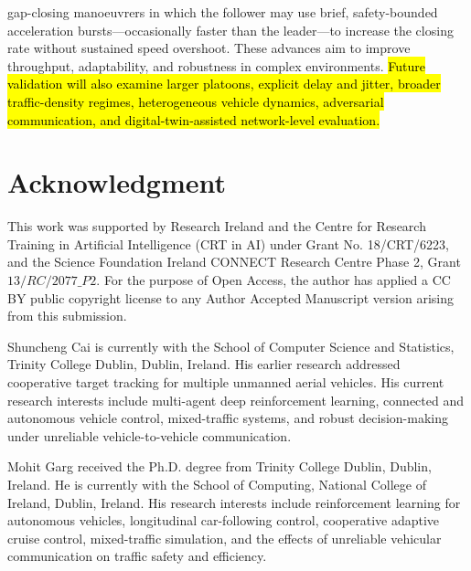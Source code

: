 \documentclass{ieeeaccess}
\begin{document}
gap-closing manoeuvrers in which the follower may use brief, safety-bounded acceleration bursts—occasionally faster than the leader—to increase the closing rate without sustained speed overshoot. These advances aim to improve throughput, adaptability, and robustness in complex environments. \hl{Future validation will also examine larger platoons, explicit delay and jitter, broader traffic-density regimes, heterogeneous vehicle dynamics, adversarial communication, and digital-twin-assisted network-level evaluation.} %

\section*{Acknowledgment}
This work was supported by Research Ireland and the Centre for Research Training in Artificial Intelligence (CRT in AI) under Grant No. 18/CRT/6223, and the Science Foundation Ireland CONNECT Research Centre Phase 2, Grant $13/RC/2077\_P2$. For the purpose of Open Access, the author has applied a CC BY public copyright license to any Author Accepted Manuscript version arising from this submission.






\begin{IEEEbiographynophoto}{Shuncheng Cai}
is currently with the School of Computer Science and Statistics, Trinity
College Dublin, Dublin, Ireland. His earlier research addressed cooperative
target tracking for multiple unmanned aerial vehicles. His current research
interests include multi-agent deep reinforcement learning, connected and
autonomous vehicle control, mixed-traffic systems, and robust decision-making
under unreliable vehicle-to-vehicle communication.
\end{IEEEbiographynophoto}


\begin{IEEEbiographynophoto}{Mohit Garg}
received the Ph.D. degree from Trinity College Dublin, Dublin, Ireland. He is
currently with the School of Computing, National College of Ireland, Dublin,
Ireland. His research interests include reinforcement learning for autonomous
vehicles, longitudinal car-following control, cooperative adaptive cruise
control, mixed-traffic simulation, and the effects of unreliable vehicular
communication on traffic safety and efficiency.
\end{IEEEbiographynophoto}
\end{document}
